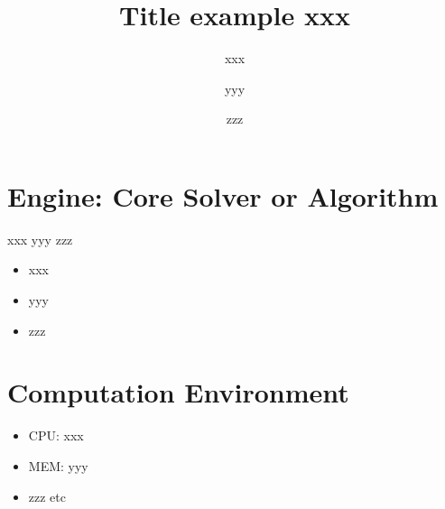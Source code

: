 \documentclass{article}
\date{}
\title{Title example xxx}
\author[1]{xxx}
\author[2]{yyy}
\author[1]{zzz}
\affil[1]{affil1}
\affil[2]{affil2}
\begin{document}
\maketitle

\section{Engine: Core Solver or Algorithm}
xxx yyy zzz
\begin{itemize}
\item xxx
\item yyy
\item zzz
\end{itemize}

\section{Computation Environment}
\begin{itemize}
\item CPU: xxx
\item MEM: yyy
\item zzz etc
\end{itemize}
\end{document}
